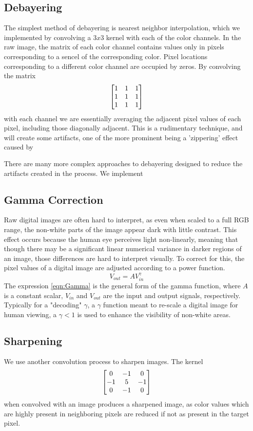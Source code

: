 \documentclass{article}
\begin{document}
\subsection{Debayering}
    The simplest method of debayering is nearest neighbor interpolation, which we implemented by convolving a  $3x3$ kernel with each of the color channels. In the raw image, the matrix of each color channel contains values only in pixels corresponding to a sencel of the corresponding color. Pixel locations corresponding to a different color channel are occupied by zeros. By convolving the matrix 
    \begin{align}
        \begin{bmatrix} 1 & 1 & 1 \\ 1 & 1 & 1 \\ 1 & 1 & 1 \end{bmatrix}
    \end{align}
    with each channel we are essentially averaging the adjacent pixel values of each pixel, including those diagonally adjacent. This is a rudimentary technique, and will create some artifacts, one of the more prominent being a 'zippering' effect caused by %
    
    There are many more complex approaches to debayering designed to reduce the artifacts created in the process. We implement 
\subsection{Gamma Correction}
    Raw digital images are often hard to interpret, as even when scaled to a full RGB range, the non-white parts of the image appear dark with little contrast. This effect occurs because the human eye perceives light non-linearly, meaning that though there may be a significant linear numerical variance in darker regions of an image, those differences are hard to interpret visually. To correct for this, the pixel values of a digital image are adjusted according to a power function. 
    \begin{equation}
        V_{out} = AV_{in}^{\gamma} \label{eqn:Gamma}
    \end{equation}
    The expression \eqref{eqn:Gamma} is the general form of the gamma function, where $A$ is a constant scalar, $V_{in}$ and $V_{out}$ are the input and output signals, respectively. 
    Typically for a "decoding" $\gamma$, a $\gamma$  function meant to re-scale a digital image for human viewing, a $\gamma < 1$ is used to enhance the visibility of non-white areas. 
\subsection{Sharpening}
    We use another convolution process to sharpen images. The kernel 
    \begin{align}
        \begin{bmatrix} 0 & -1 & 0 \\ -1 & 5 & -1 \\ 0 & -1 & 0 \end{bmatrix}
    \end{align}
    when convolved with an image produces a sharpened image, as color values which are highly present in neighboring pixels are reduced if not as present in the target pixel.  
\end{document}
